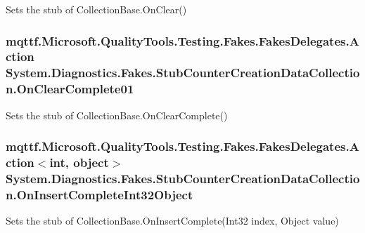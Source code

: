 Sets the stub of Collection\-Base.\-On\-Clear()

\hypertarget{class_system_1_1_diagnostics_1_1_fakes_1_1_stub_counter_creation_data_collection_adaa817ef11290ed124c783ba81053066}{
\subsubsection[{On\-Clear\-Complete01}]{\setlength{\rightskip}{0pt plus 5cm}mqttf.\-Microsoft.\-Quality\-Tools.\-Testing.\-Fakes.\-Fakes\-Delegates.\-Action System.\-Diagnostics.\-Fakes.\-Stub\-Counter\-Creation\-Data\-Collection.\-On\-Clear\-Complete01}}\label{class_system_1_1_diagnostics_1_1_fakes_1_1_stub_counter_creation_data_collection_adaa817ef11290ed124c783ba81053066}


Sets the stub of Collection\-Base.\-On\-Clear\-Complete()

\hypertarget{class_system_1_1_diagnostics_1_1_fakes_1_1_stub_counter_creation_data_collection_a824a8f20332b95c045c920d5a1f19665}{
\subsubsection[{On\-Insert\-Complete\-Int32\-Object}]{\setlength{\rightskip}{0pt plus 5cm}mqttf.\-Microsoft.\-Quality\-Tools.\-Testing.\-Fakes.\-Fakes\-Delegates.\-Action$<$int, object$>$ System.\-Diagnostics.\-Fakes.\-Stub\-Counter\-Creation\-Data\-Collection.\-On\-Insert\-Complete\-Int32\-Object}}\label{class_system_1_1_diagnostics_1_1_fakes_1_1_stub_counter_creation_data_collection_a824a8f20332b95c045c920d5a1f19665}


Sets the stub of Collection\-Base.\-On\-Insert\-Complete(\-Int32 index, Object value)

